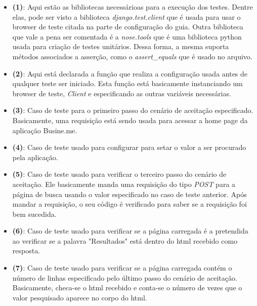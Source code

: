     \begin{itemize}
        \item \textbf{(1)}: Aqui estão as bibliotecas necessárioas para a
            execução dos testes. Dentre elas, pode ser visto a biblioteca
            \emph{django.test.client} que é usada para usar o browser de teste
            citada na parte de configuração do guia. Outra biblioteca que vale a
            pena ser comentada é a \emph{nose.tools} que é uma biblioteca python
            usada para criação de testes unitários. Dessa forma, a mesma suporta
            métodos associados a asserção, como o \textit{assert\_equals} que é
            usado no arquivo.
        
        \item \textbf{(2)}: Aqui está declarada a função que realiza a
            configuração usada antes de qualquer teste ser iniciado. Esta função
            está basicamente instanciando um browser de teste, \textit{Client} e
            especificando as outras variáveis necessárias.

        \item \textbf{(3)}: Caso de teste para o primeiro passo do cenário de
            aceitação especificado. Basicamente, uma requisição está sendo usada
            para acessar a home page da aplicação Busine.me.

        \item \textbf{(4)}: Caso de teste usado para configurar para setar o
            valor a ser procurado pela aplicação.

        \item \textbf{(5)}: Caso de teste usado para verificar o terceiro passo
            do cenário de aceitação. Ele basicamente manda uma requisição do
            tipo \textit{POST} para a página de busca usando o valor
            especificado no caso de teste anterior. Após mandar a requisição, o
            seu código é verificado para saber se a requisição foi bem sucedida.

        \item \textbf{(6)}: Caso de teste usado para verificar se a página
            carregada é a pretendida ao verificar se a palavra "Resultados" está
            dentro do html recebido como resposta.

        \item \textbf{(7)}: Caso de teste usado para verificar se a página
            carregada contém o número de linhas especificado pelo último passo
            do cenário de aceitação. Basicamente, checa-se o html recebido e
            conta-se o número de vezes que o valor pesquisado aparece no corpo
            do html. 

    \end{itemize}

